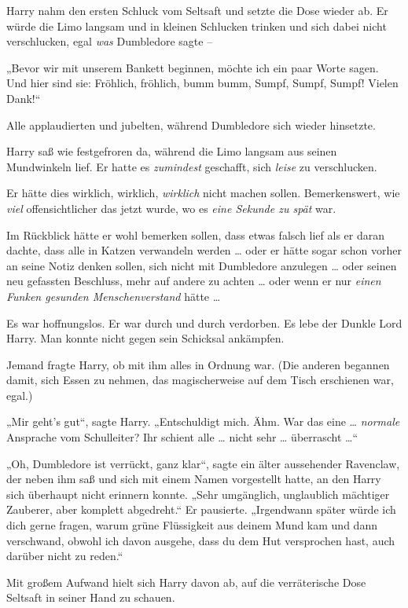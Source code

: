 {Harry nahm den ersten Schluck vom Seltsaft und setzte die Dose wieder ab. Er würde die Limo langsam und in kleinen Schlucken trinken und sich dabei nicht verschlucken, egal \emph{was} Dumbledore sagte --

„Bevor wir mit unserem Bankett beginnen, möchte ich ein paar Worte sagen. Und hier sind sie: Fröhlich, fröhlich, bumm bumm, Sumpf, Sumpf, Sumpf! Vielen Dank!“

Alle applaudierten und jubelten, während Dumbledore sich wieder hinsetzte.

Harry saß wie festgefroren da, während die Limo langsam aus seinen Mundwinkeln lief. Er hatte es \emph{zumindest} geschafft, sich \emph{leise} zu verschlucken.

Er hätte dies wirklich, wirklich, \emph{wirklich} nicht machen sollen. Bemerkenswert, wie \emph{viel} offensichtlicher das jetzt wurde, wo es \emph{eine Sekunde zu spät} war.

Im Rückblick hätte er wohl bemerken sollen, dass etwas falsch lief als er daran dachte, dass alle in Katzen verwandeln werden … oder er hätte sogar schon vorher an seine Notiz denken sollen, sich nicht mit Dumbledore anzulegen … oder seinen neu gefassten Beschluss, mehr auf andere zu achten … oder wenn er nur \emph{einen Funken gesunden Menschenverstand} hätte …

Es war hoffnungslos. Er war durch und durch verdorben. Es lebe der Dunkle Lord Harry. Man konnte nicht gegen sein Schicksal ankämpfen.

Jemand fragte Harry, ob mit ihm alles in Ordnung war. (Die anderen begannen damit, sich Essen zu nehmen, das magischerweise auf dem Tisch erschienen war, egal.)

„Mir geht's gut“, sagte Harry. „Entschuldigt mich. Ähm. War das eine … \emph{normale} Ansprache vom Schulleiter? Ihr schient alle … nicht sehr … überrascht …“

„Oh, Dumbledore ist verrückt, ganz klar“, sagte ein älter aussehender Ravenclaw, der neben ihm saß und sich mit einem Namen vorgestellt hatte, an den Harry sich überhaupt nicht erinnern konnte. „Sehr umgänglich, unglaublich mächtiger Zauberer, aber komplett abgedreht.“ Er pausierte. „Irgendwann später würde ich dich gerne fragen, warum grüne Flüssigkeit aus deinem Mund kam und dann verschwand, obwohl ich davon ausgehe, dass du dem Hut versprochen hast, auch darüber nicht zu reden.“

Mit großem Aufwand hielt sich Harry davon ab, auf die verräterische Dose Seltsaft in seiner Hand zu schauen.

}
